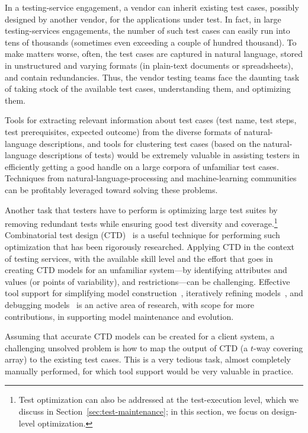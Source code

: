 In a testing-service engagement, a vendor can inherit existing test cases,
possibly designed by another vendor, for the applications under test. In fact,
in large testing-services engagements, the number of such test cases can easily
run into tens of thousands (sometimes even exceeding a couple of hundred
thousand).  To make matters worse, often, the test cases are captured in natural
language, stored in unstructured and varying formats (\eg in plain-text
documents or spreadsheets), and contain redundancies. Thus, the vendor testing
teams face the daunting task of taking stock of the available test cases,
understanding them, and optimizing them.

Tools for extracting relevant information about test cases (\eg test name, test
steps, test prerequisites, expected outcome) from the diverse formats of
natural-language descriptions, and tools for clustering test cases (based on the
natural-language descriptions of tests) would be extremely valuable in assisting
testers in efficiently getting a good handle on a large corpora of unfamiliar
test cases. Techniques from natural-language-processing and machine-learning
communities can be profitably leveraged toward solving these problems.

Another task that testers have to perform is optimizing large test suites by
removing redundant tests while ensuring good test diversity and
coverage.\footnote{\small Test optimization can also be addressed at the
  test-execution level, which we discuss in Section~\ref{sec:test-maintenance};
  in this section, we focus on design-level optimization.} Combinatorial test
design (CTD)~\cite{Cohen:1996, Cohen:1997, Cohen:2003} is a useful technique for
performing such optimization that has been rigorously researched. Applying CTD
in the context of testing services, with the available skill level and the
effort that goes in creating CTD models for an unfamiliar system---by
identifying attributes and values (or points of variability), and
restrictions---can be challenging. Effective tool support for simplifying model
construction~\cite{Segall:2012a}, iteratively refining
models~\cite{Segall:2012b}, and debugging models~\cite{Farchi:2013} is an active
area of research, with scope for more contributions, \eg in supporting model
maintenance and evolution.

Assuming that accurate CTD models can be created for a client system, a
challenging unsolved problem is how to map the output of CTD (\ie a $t$-way
covering array) to the existing test cases. This is a very tedious task, almost
completely manually performed, for which tool support would be very valuable in
practice.

